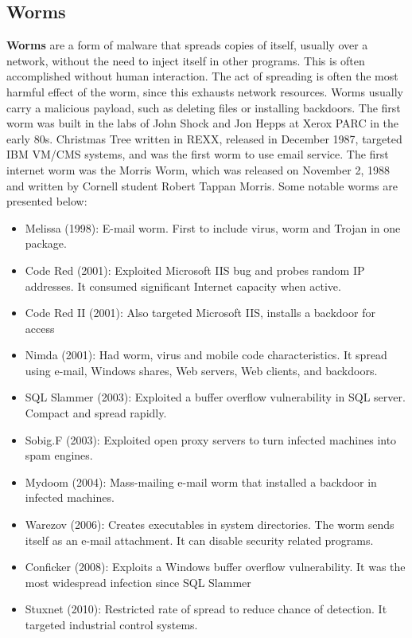 \documentclass[11pt]{article}
\theoremstyle{plain} %
\theoremstyle{definition}
\theoremstyle{example}
\theoremstyle{remark}
\begin{document}
\subsection{Worms}
\textbf{Worms} are a form of malware that spreads copies of itself, usually over a network, without the need to inject itself in other programs. This is often accomplished without human interaction. The act of spreading is often the most harmful effect of the worm, since this exhausts network resources. Worms usually carry a malicious payload, such as deleting files or installing backdoors. The first worm was built in the labs of John Shock and Jon Hepps at Xerox PARC in the early 80s. Christmas Tree written in REXX, released in December 1987, targeted IBM VM/CMS systems, and was the first worm to use email service. The first internet worm was the Morris Worm, which was released on November 2, 1988 and written by Cornell student Robert Tappan Morris. Some notable worms are presented below:
\begin{itemize}
	\item Melissa (1998): E-mail worm. First to include virus, worm and Trojan in one package.
	\item Code Red (2001): Exploited Microsoft IIS bug and probes random IP addresses. It consumed significant Internet capacity when active.
	\item Code Red II (2001): Also targeted Microsoft IIS, installs a backdoor for access
	\item Nimda (2001): Had worm, virus and mobile code characteristics. It spread using e-mail, Windows shares, Web servers, Web clients, and backdoors.
	\item SQL Slammer (2003): Exploited a buffer overflow vulnerability in SQL server. Compact and spread rapidly.
	\item Sobig.F (2003): Exploited open proxy servers to turn infected machines into spam engines.
	\item Mydoom (2004): Mass-mailing e-mail worm that installed a backdoor in infected machines.
	\item Warezov (2006): Creates executables in system directories. The worm sends itself as an e-mail attachment. It can disable security related programs.
	\item Conficker (2008): Exploits a Windows buffer overflow vulnerability. It was the most widespread infection since SQL Slammer
	\item Stuxnet (2010): Restricted rate of spread to reduce chance of detection. It targeted industrial control systems.
\end{itemize}
\end{document}
